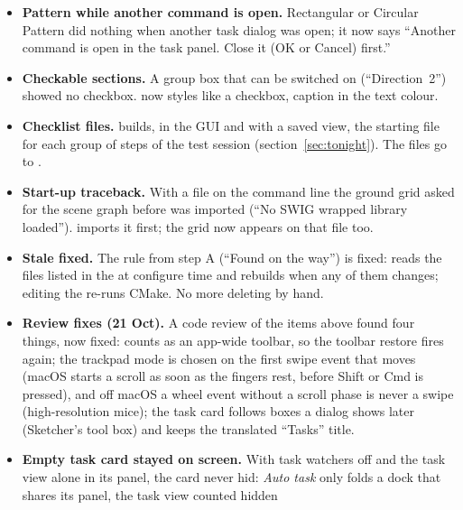 \begin{itemize}[nosep]
        older sketches opened without one.  switches it on whenever a sketch opens for
        editing; the sketch panel can still hide it. Switch , on.
  \item \textbf{Pattern while another command is open.} Rectangular or Circular Pattern did nothing when another
        task dialog was open; it now says ``Another command is open in the task panel. Close it (OK or Cancel)
        first.''
  \item \textbf{Checkable sections.} A group box that can be switched on (``Direction~2'') showed no checkbox.
         now styles  like a checkbox, caption in the text colour.
  \item \textbf{Checklist files.}  builds, in the GUI and with a saved view,
        the starting file for each group of steps of the test session (section~\ref{sec:tonight}). The files go
        to .
  \item \textbf{Start-up traceback.} With a file on the command line the ground grid asked for the scene graph
        before  was imported (``No SWIG wrapped library loaded'').  imports
        it first; the grid now appears on that file too.
  \item \textbf{Stale  fixed.} The rule from step A (``Found on the way'') is fixed: 
        reads the files listed in the  at configure time and rebuilds  when any of
        them changes; editing the  re-runs CMake. No more deleting  by hand.
  \item \textbf{Review fixes (21 Oct).} A code review of the items above found four things, now fixed:
         counts as an app-wide toolbar, so the toolbar restore fires again; the trackpad mode is
        chosen on the first swipe event that moves (macOS starts a scroll as soon as the fingers rest, before
        Shift or Cmd is pressed), and off macOS a wheel event without a scroll phase is never a swipe
        (high-resolution mice); the task card follows boxes a dialog shows later (Sketcher's tool box) and keeps
        the translated ``Tasks'' title.
  \item \textbf{Empty task card stayed on screen.} With task watchers off and the task view alone in its panel, the
        card never hid: \emph{Auto task} only folds a dock that shares its panel, the task view counted hidden

\end{itemize}
